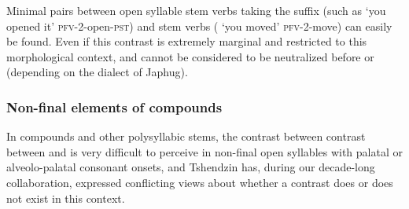 Minimal pairs between open syllable  stem verbs taking the  suffix (such as  `you opened it' \textsc{pfv}-2-open-\textsc{pst}) and  stem verbs ( `you moved' \textsc{pfv}-2-move) can easily be found. Even if this contrast is extremely marginal and restricted to this morphological context,  and  cannot be considered to be neutralized before  or  (depending on the dialect of Japhug).

\subsubsection{Non-final elements of compounds} \label{sec:W.i.compounds}
In compounds and other polysyllabic stems, the contrast between contrast between  and  is very difficult to perceive in non-final open syllables with palatal or alveolo-palatal consonant onsets, and Tshendzin has, during our decade-long collaboration, expressed conflicting views about whether a contrast does or does not exist in this context.

